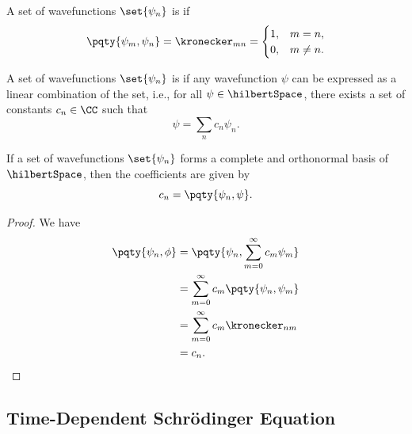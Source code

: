 \begin{definition}
    A set of wavefunctions \(\set{\psi_n}\) is  if
    \begin{equation}
        \pqty{\psi_m, \psi_n} = \kronecker_{mn} = \begin{cases}
            1, & m = n, \\
            0, & m \neq n.
        \end{cases}
    \end{equation}
\end{definition}

\begin{definition}
    A set of wavefunctions \(\set{\psi_n}\) is  if any wavefunction \(\psi\) can be expressed as a linear combination of the set, i.e., for all \(\psi \in \hilbertSpace\), there exists a set of constants \(c_n \in \CC\) such that
    \begin{equation}
        \psi = \sum_n c_n \psi_n.
    \end{equation}
\end{definition}

\begin{lemma}
    If a set of wavefunctions \(\set{\psi_n}\) forms a complete and orthonormal basis of \(\hilbertSpace\), then the coefficients are given by
    \begin{equation}
        c_n = \pqty{\psi_n, \psi}.
    \end{equation}
\end{lemma}

\begin{proof}
    We have
    \begin{subequations}
        \begin{align}
            \pqty{\psi_n, \phi} &= \pqty{\psi_n, \sum_{m = 0}^{\infty} c_m \psi_m} \\
            &= \sum_{m = 0}^{\infty} c_m \pqty{\psi_n, \psi_m} \\
            &= \sum_{m = 0}^{\infty} c_m \kronecker_{nm} \\
            &= c_n.
        \end{align}
    \end{subequations}
\end{proof}

\subsection{Time-Dependent Schr\"odinger Equation}

